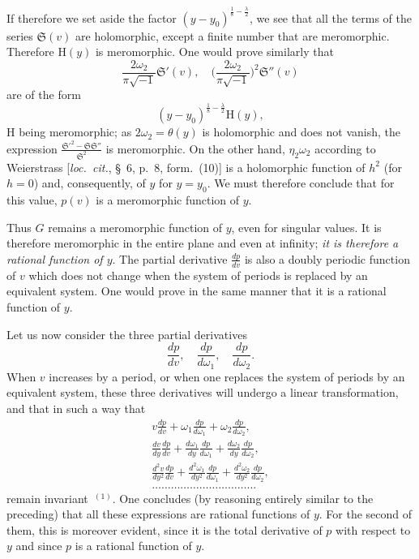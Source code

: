 \documentclass{article}
\begin{document}
If therefore we set aside the factor $(y - y_{0})^{\frac{1}{8} - \frac{\lambda}{2}}$, we see that all the terms of the series $\mathfrak{S}(v)$ are holomorphic, except a finite number that are meromorphic. Therefore $\mathrm{H}(y)$ is meromorphic. One would prove similarly that
\[
\frac{2\omega_{2}}{\pi\sqrt{-1}} \mathfrak{S}'(v), \quad \biggl( \frac{2\omega_{2}}{\pi\sqrt{-1}} \biggr)^{2} \mathfrak{S}''(v)
\]
are of the form
\[
(y - y_{0})^{\frac{1}{8} - \frac{\lambda}{2}} \mathrm{H}(y),
\]
$\mathrm{H}$ being meromorphic; as $2\omega_{2} = \theta(y)$ is holomorphic and does not vanish, the expression $\frac{\mathfrak{S}'^{2} - \mathfrak{S}\mathfrak{S}''}{\mathfrak{S}^{2}}$ is meromorphic. On the other hand, $\eta_{2}\omega_{2}$ according to Weierstrass [\emph{loc.~cit.}, \S~6, p.~8, form.~(10)] is a holomorphic function of $h^{2}$ (for $h = 0$) and, consequently, of $y$ for $y = y_{0}$. We must therefore conclude that for this value, $p(v)$ is a meromorphic function of $y$.

Thus $G$ remains a meromorphic function of $y$, even for singular values. It is therefore meromorphic in the entire plane and even at infinity; \emph{it is therefore a rational function of $y$}.
The partial derivative $\frac{dp}{dv}$ is also a doubly periodic function of $v$ which does not change when the system of periods is replaced by an equivalent system. One would prove in the same manner that it is a rational function of $y$.

Let us now consider the three partial derivatives
\[
\frac{dp}{dv}, \quad \frac{dp}{d\omega_{1}}, \quad \frac{dp}{d\omega_{2}}.
\]
When $v$ increases by a period, or when one replaces the system of periods by an equivalent system, these three derivatives will undergo a linear transformation, and that in such a way that
\[
\begin{gathered}
v \frac{dp}{dv} + \omega_{1} \frac{dp}{d\omega_{1}} + \omega_{2} \frac{dp}{d\omega_{2}}, \\
\frac{dv}{dy} \frac{dp}{dv} + \frac{d\omega_{1}}{dy} \frac{dp}{d\omega_{1}} + \frac{d\omega_{2}}{dy} \frac{dp}{d\omega_{2}}, \\
\frac{d^{2}v}{dy^{2}} \frac{dp}{dv} + \frac{d^{2}\omega_{1}}{dy^{2}} \frac{dp}{d\omega_{1}} + \frac{d^{2}\omega_{2}}{dy^{2}} \frac{dp}{d\omega_{2}}, \\
\dots\dots\dots\dots\dots\dots\dots\dots\dots\dots\dots
\end{gathered} \tag{3}
\]
remain invariant~${}^{(1)}$. One concludes (by reasoning entirely similar to the preceding) that all these expressions are rational functions of $y$. For the second of them, this is moreover evident, since it is the total derivative of $p$ with respect to $y$ and since $p$ is a rational function of $y$.
\end{document}

